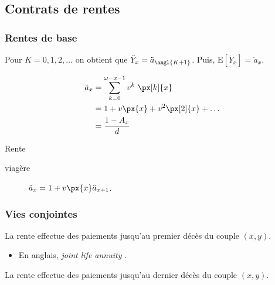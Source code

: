 \documentclass[french]{article}
\begin{document}
\begin{multicols*}{2}
\columnbreak
\subsection{Contrats de rentes}
\subsubsection{Rentes de base}
\begin{definitionNOHFILLsub}
Pour $K = 0, 1, 2,\dots$ on obtient que $\ddot{Y}_{x} = \ddot{a}_{\angl{K + 1}}$. Puis, $\text{E}[\ddot{Y}_{x}] = \ddot{a}_{x}$.

\begin{align*}
	\ddot{a}_{x}
	&=	\sum_{k = 0}^{\omega - x - 1} v^{k} \ \px[k]{x}	\\
	&=	1 + v \px{x} + v^{2} \px[2]{x} + \dots	\\
	&=	\frac{1 - A_{x}}{d}
\end{align*}
\end{definitionNOHFILLsub}

\begin{definitionNOHFILLprop}[Relations]
Rente
\begin{description}
	\item[viagère]	$\ddot{a}_{x} = 1 + v\px{x} \ddot{a}_{x + 1}$.
\end{description}
\end{definitionNOHFILLprop}




\subsubsection{Vies conjointes}
\begin{definitionNOHFILLsub}
La rente  effectue des paiements jusqu'au premier décès du couple $(x, y)$.

\begin{itemize}
	\item	En anglais, \og \textit{joint life annuity} \fg{}.
\end{itemize}
\end{definitionNOHFILLsub}

\begin{definitionNOHFILLsub}
La rente  effectue des paiements jusqu'au dernier décès du couple $(x, y)$.


\end{definitionNOHFILLsub}
\end{multicols*}
\end{document}
